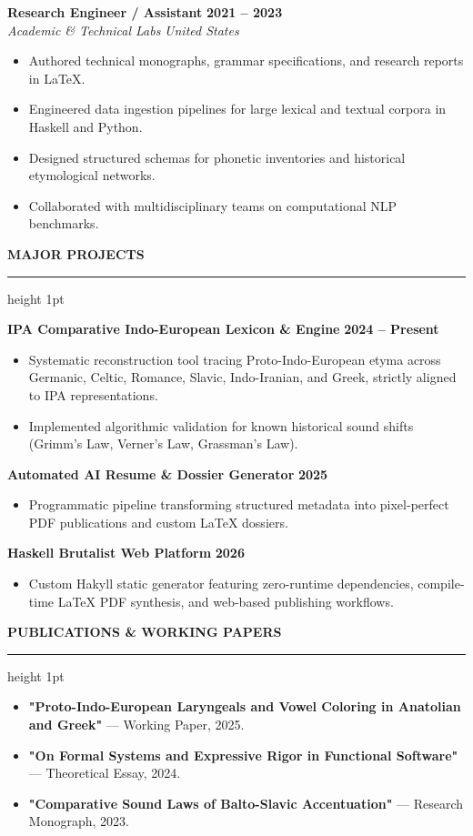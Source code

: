 \documentclass[10pt,letterpaper]{article}
\newcommand{\cvsection}[1]{%
    \vspace{10pt}%
    {\large\bfseries\uppercase{#1}}%
    \vspace{2pt}%
    \hrule height 1pt%
    \vspace{6pt}%
}
\begin{document}
\vspace{5pt}
\textbf{Research Engineer / Assistant} \hfill \textbf{2021 -- 2023} \\
\textit{Academic \& Technical Labs} \hfill \textit{United States}
\begin{itemize}
    \item Authored technical monographs, grammar specifications, and research reports in LaTeX.
    \item Engineered data ingestion pipelines for large lexical and textual corpora in Haskell and Python.
    \item Designed structured schemas for phonetic inventories and historical etymological networks.
    \item Collaborated with multidisciplinary teams on computational NLP benchmarks.
\end{itemize}

\cvsection{Major Projects}
\textbf{IPA Comparative Indo-European Lexicon \& Engine} \hfill \textbf{2024 -- Present}
\begin{itemize}
    \item Systematic reconstruction tool tracing Proto-Indo-European etyma across Germanic, Celtic, Romance, Slavic, Indo-Iranian, and Greek, strictly aligned to IPA representations.
    \item Implemented algorithmic validation for known historical sound shifts (Grimm's Law, Verner's Law, Grassman's Law).
\end{itemize}

\vspace{4pt}
\textbf{Automated AI Resume \& Dossier Generator} \hfill \textbf{2025}
\begin{itemize}
    \item Programmatic pipeline transforming structured metadata into pixel-perfect PDF publications and custom LaTeX dossiers.
\end{itemize}

\vspace{4pt}
\textbf{Haskell Brutalist Web Platform} \hfill \textbf{2026}
\begin{itemize}
    \item Custom Hakyll static generator featuring zero-runtime dependencies, compile-time LaTeX PDF synthesis, and web-based publishing workflows.
\end{itemize}

\cvsection{Publications \& Working Papers}
\begin{itemize}
    \item \textbf{"Proto-Indo-European Laryngeals and Vowel Coloring in Anatolian and Greek"} --- Working Paper, 2025.
    \item \textbf{"On Formal Systems and Expressive Rigor in Functional Software"} --- Theoretical Essay, 2024.
    \item \textbf{"Comparative Sound Laws of Balto-Slavic Accentuation"} --- Research Monograph, 2023.
\end{itemize}
\end{document}
